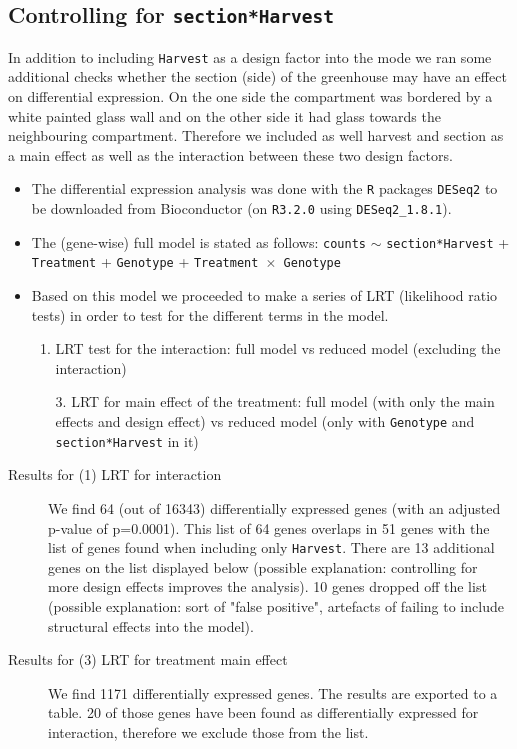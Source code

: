\documentclass[12pt, a4paper]{article}
\begin{document}
\subsection*{Controlling for \texttt{section*Harvest}}
In addition to including \texttt{Harvest} as a design factor into the mode we ran some additional checks whether the 
section (side) of the greenhouse may have an effect on differential expression. On the one side the 
compartment was bordered by a white painted glass wall and on the other side it had glass towards the
neighbouring compartment. Therefore we included as well harvest and section as a main effect as well as the 
interaction between these two design factors.

\begin{itemize}

\item The differential expression analysis was done with the \texttt{R} packages \texttt{DESeq2}
to be downloaded from Bioconductor (on \texttt{R3.2.0} using \texttt{DESeq2\_1.8.1}). 

\item The (gene-wise) full model is stated as follows: 
\newline \texttt{counts} $\sim$ \texttt{section*Harvest} + \texttt{Treatment} + \texttt{Genotype} + \texttt{Treatment $\times$ Genotype} 

\item Based on this model we proceeded to make a series of LRT (likelihood ratio tests) in order to test for 
the different terms in the model.
	\begin{enumerate}
	\item LRT test for the interaction: full model vs reduced model (excluding the interaction)
	\item[3.] LRT for main effect of the treatment: full model (with only the main effects and design effect) vs reduced model (only with \texttt{Genotype} and \texttt{section*Harvest} in it)
	\end{enumerate}

\end{itemize}

\begin{description}
\item[Results for (1) LRT for interaction]
	We find 64 (out of 16343) differentially expressed genes (with an adjusted p-value of p=0.0001). This list of 64 genes overlaps in 51 genes with the list of genes found when including only \texttt{Harvest}. There are 
	13 additional genes on the list displayed below (possible explanation: controlling for more design effects 
	improves the analysis). 10 genes dropped off the list (possible explanation: sort of "false positive", artefacts of failing to include structural effects into the model).
\item[Results for (3) LRT for treatment main effect] 
	We find 1171 differentially expressed genes. The results are exported to a table. 20 of those genes have been 
	found as differentially expressed for interaction, therefore we exclude those from the list.	
\end{description}
\end{document}

